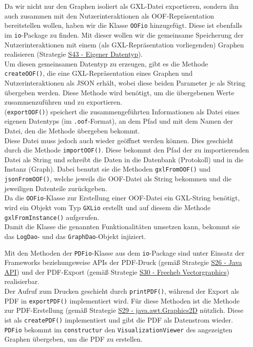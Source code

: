 \documentclass[enabledeprecatedfontcommands,fontsize=11pt,paper=a4,twoside]{scrartcl}
\newcounter{one}
\begin{document}
	Da wir nicht nur den Graphen isoliert als GXL-Datei exportieren, sondern ihn auch zusammen mit den Nutzerinteraktionen als OOF-Repräsentation bereitstellen wollen, haben wir die Klasse \texttt{OOFio} hinzugefügt. Diese ist ebenfalls im \texttt{io}-Package zu finden. Mit dieser wollen wir die gemeinsame Speicherung der Nutzerinteraktionen mit einem (als GXL-Repräsentation vorliegenden) Graphen realisieren (Strategie \hyperlink{ooo}{S43 - Eigener Datentyp}). \\
	
	Um diesen gemeinsamen Datentyp zu erzeugen, gibt es die Methode \texttt{createOOF()}, die eine GXL-Repräsentation eines Graphen und Nutzerinteraktionen als JSON erhält, wobei diese beiden Parameter je als String übergeben werden. Diese Methode wird benötigt, um die übergebenen Werte zusammenzuführen und zu exportieren. \\
	(\texttt{exportOOF()}) speichert die zusammengeführten Informationen als Datei eines eigenen Datentyps (im \texttt{.oof}-Format), an dem Pfad und mit dem Namen der Datei, den die Methode übergeben bekommt. \\
	
	Diese Datei muss jedoch auch wieder geöffnet werden können. Dies geschieht durch die Methode \texttt{importOOF()}. Diese bekommt den Pfad der zu importierenden Datei als String und schreibt die Daten in die Datenbank (Protokoll) und in die Instanz (Graph). Dabei benutzt sie die Methoden \texttt{gxlFromOOF()} und \texttt{jsonFromOOF()}, welche jeweils die OOF-Datei als String bekommen und die jeweiligen Datenteile zurückgeben. \\
	Da die \texttt{OOFio}-Klasse zur Erstellung einer OOF-Datei ein GXL-String benötigt, wird ein Objekt vom Typ \texttt{GXLio} erstellt und auf diesem die Methode \texttt{gxlFromInstance()} aufgerufen.\\ 
	
	Damit die Klasse die genannten Funktionalitäten umsetzen kann, bekommt sie das \texttt{LogDao}- und das \texttt{GraphDao}-Objekt injiziert. 
	
	Mit den Methoden der \texttt{PDFio}-Klasse aus dem \texttt{io}-Package sind unter Einsatz der Frameworks beziehungsweise APIs der PDF-Druck (gemäß Strategie \hyperlink{ggg}{S26 - Java API}) und der PDF-Export (gemäß Strategie \hyperlink{iii}{S30 - Freeheb Vectorgraphics}) realisierbar. \\
	Der Aufruf zum Drucken geschieht durch \texttt{printPDF()}, während der Export als PDF in \texttt{exportPDF()} implementiert wird. Für diese Methoden ist die Methode zur PDF-Erstellung (gemäß Strategie \hyperlink{hhh}{S29 - java.awt.Graphics2D} nützlich. Diese ist als \texttt{createPDF()} implementiert und gibt die PDF als Datenstrom wieder. \\
	\texttt{PDFio} bekommt im \texttt{constructur} den \texttt{VisualizationViewer} des angezeigten Graphen übergeben, um die PDF zu erstellen. \\
	
\end{document}
